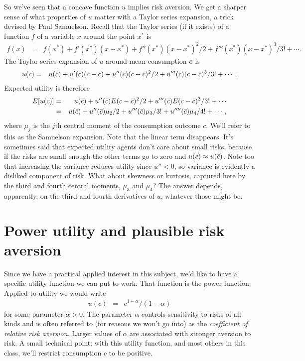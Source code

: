 \documentclass[11pt]{article}
\begin{document}
So we've seen that a concave function $u$ implies risk aversion.
We get a sharper sense of what properties of $u$ matter with
a Taylor series expansion, a trick devised by Paul Samuelson.
Recall that the Taylor series (if it exists) of a
function $f$ of a variable $x$ around the point $x^*$ is
\begin{eqnarray*}
    f(x) &=& f(x^*) + f'(x^*) (x-x^*) + f''(x^*) (x-x^*)^2/2 +
        f'''(x^*) (x-x^*)^3/3! + \cdots .
\end{eqnarray*}
The Taylor series expansion of $u$ around mean consumption $\bar{c}$
is
\begin{eqnarray*}
    u(c) &=& u(\bar{c}) + u'(\bar{c}) (c-\bar{c})  + u''(\bar{c}) (c-\bar{c})^2/2
        + u'''(\bar{c}) (c-\bar{c})^3/3! + \cdots .
\end{eqnarray*}
Expected utility is therefore
\begin{eqnarray}
  E [u(c)] &=& u(\bar{c}) + u''(\bar{c}) E (c-\bar{c})^2/2
        + u'''(\bar{c}) E (c-\bar{c})^3/3! + \cdots \nonumber \\
        &=& u(\bar{c}) + u''(\bar{c}) \mu_2/2
            + u'''(\bar{c}) \mu_3 /3! + u''''(\bar{c}) \mu_4 /4! + \cdots ,
        \label{eq:eu-samuelson}
\end{eqnarray}
where $\mu_j$ is the $j$th central moment of the consumption outcome $c$.
We'll refer to this as the Samuelson expansion.
Note that the linear term disappears.
It's sometimes said that expected utility agents
don't care about small risks, because if the risks are small enough
the other terms go to zero and $u(c) \approx u(\bar{c})$.
Note too that increasing the variance reduces
utility since $u'' < 0$,
so variance is evidently a disliked component of risk.
What about skewness or kurtosis, captured here by the third
and fourth central moments, $\mu_3$ and $\mu_4$?
The answer depends, apparently,
on the third and fourth derivatives of $u$,
whatever those might be.


\section{Power utility and plausible risk aversion}

Since we have a practical applied interest in this subject,
we'd like to have a specific utility function we can put to work.
That function is the power function.
Applied to utility we would write
\begin{eqnarray*}
    u(c) &=& c^{1-\alpha}/(1-\alpha)
\end{eqnarray*}
for some parameter $\alpha > 0$.
The parameter $\alpha$ controls sensitivity to risks of all kinds
and is often referred to (for reasons we won't go into)
as the {\it coefficient of relative risk aversion\/}.
Larger values of $\alpha$ are associated with stronger aversion to risk.
A small technical point:  with this utility function,
and most others in this class,
we'll restrict consumption $c$ to be positive.
\end{document}
